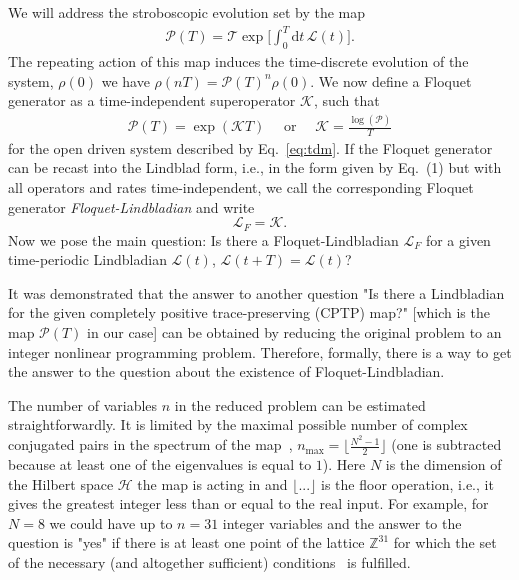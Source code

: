 \documentclass[%
 aip,
 floatfix,
 amsmath,amssymb,
 reprint,%
]{revtex4-1}
\newcommand{\rd}{\mathrm{d}}
\begin{document}
We will address the stroboscopic evolution set  by the map %
\begin{align}
\label{eq:oceo}
\mathcal{P}(T)=\mathcal{T}\exp\bigg[\int_0^T\!\rd t\, \mathcal{L}(t) \bigg].
\end{align}
The repeating action of this map induces the time-discrete evolution of the system,  $\rho(0)$ we have $\rho(nT) = \mathcal{P}(T)^n \rho(0)$. We now define a Floquet generator as a time-independent superoperator $\mathcal{K}$, such that
\begin{align}
\mathcal{P}(T) =  \exp\left({\mathcal{K} T}\right) \quad\text{  or   }\quad  \mathcal{K} =\frac{ \log(\mathcal{P})}{T} 
\label{eq:generator-cand}
\end{align}
for the open driven system described by  Eq.~\eqref{eq:tdm}.
If the Floquet generator can be recast into the Lindblad form, i.e., in the form given by  Eq.~(1) but with all operators and rates time-independent,  we  call the corresponding Floquet generator  \emph{Floquet-Lindbladian} and write
\begin{equation}
\mathcal{L}_F = \mathcal{K}.
\end{equation}
Now we pose the main question: Is there a Floquet-Lindbladian $\mathcal{L}_F$ for a given time-periodic Lindbladian $\mathcal{L}(t)$,
$\mathcal{L}(t+T) = \mathcal{L}(t)$? 


It was demonstrated \cite{X1,X2} that the answer to another question "Is there a Lindbladian for the given completely positive trace-preserving (CPTP) map?" [which is the map $\mathcal{P}(T)$ in our case] can be obtained by reducing the original problem to an integer nonlinear programming problem. Therefore, formally, there is a way to get the answer to the question about the existence of Floquet-Lindbladian. 


The number of variables $n$ in the reduced problem can be estimated straightforwardly. It is limited by the maximal possible number  of complex conjugated pairs in the spectrum of the map~\cite{X1,X2},  $n_{\mathrm{max}} = \lfloor \frac{N^2-1}{2}\rfloor$ (one is subtracted because at least one of the eigenvalues is equal to $1$). Here $N$ is the dimension of the Hilbert space $\mathcal{H}$ the map is acting in and $\lfloor...\rfloor$ is the floor operation, i.e., it gives the greatest integer less than or equal to the real input. For example, for $N=8$ we could have  up to $n=31$ integer variables  and the answer to the question is "yes" if there is  at least one  point of the lattice $\mathbb{Z}^{31}$ for which the set of the necessary (and altogether sufficient) conditions~\cite{X1} is fulfilled. 
\end{document}
